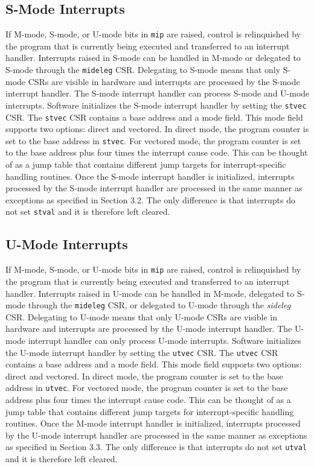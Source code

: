 \documentclass[12pt]{article}
\begin{document}
\subsection{S-Mode Interrupts}
If M-mode, S-mode, or U-mode bits in {\tt{mip}} are raised, control is relinquished by the program that is currently being executed and transferred to an interrupt handler. Interrupts raised in S-mode can be handled in M-mode or delegated to S-mode through the {\tt{mideleg}} CSR. Delegating to S-mode means that only S-mode CSRs are visible in hardware and interrupts are processed by the S-mode interrupt handler. The S-mode interrupt handler can process S-mode and U-mode interrupts. Software initializes the S-mode interrupt handler by setting the {\tt{stvec}} CSR. The {\tt{stvec}} CSR contains a base address and a mode field. This mode field supports two options: direct and vectored. In direct mode, the program counter is set to the base address in {\tt{stvec}}. For vectored mode, the program counter is set to the base address plus four times the interrupt cause code. This can be thought of as a jump table that contains different jump targets for interrupt-specific handling routines. Once the S-mode interrupt handler is initialized, interrupts processed by the S-mode interrupt handler are processed in the same manner as exceptions as specified in Section 3.2. The only difference is that interrupts do not set {\tt{stval}} and it is therefore left cleared. 

\subsection{U-Mode Interrupts}
If M-mode, S-mode, or U-mode bits in {\tt{mip}} are raised, control is relinquished by the program that is currently being executed and transferred to an interrupt handler. Interrupts raised in U-mode can be handled in M-mode, delegated to S-mode through the {\tt{mideleg}} CSR, or delegated to U-mode through the \emph{sideleg} CSR. Delegating to U-mode means that only U-mode CSRs are visible in hardware and interrupts are processed by the U-mode interrupt handler. The U-mode interrupt handler can only process U-mode interrupts. Software initializes the U-mode interrupt handler by setting the {\tt{utvec}} CSR. The {\tt{utvec}} CSR contains a base address and a mode field. This mode field supports two options: direct and vectored. In direct mode, the program counter is set to the base address in {\tt{utvec}}. For vectored mode, the program counter is set to the base address plus four times the interrupt cause code. This can be thought of as a jump table that contains different jump targets for interrupt-specific handling routines. Once the M-mode interrupt handler is initialized, interrupts processed by the U-mode interrupt handler are processed in the same manner as exceptions as specified in Section 3.3. The only difference is that interrupts do not set {\tt{utval}} and it is therefore left cleared.
\end{document}

